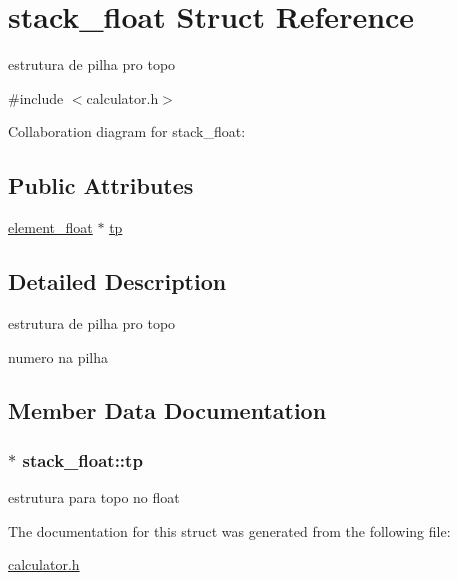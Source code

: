 \hypertarget{structstack__float}{}\section{stack\+\_\+float Struct Reference}
\label{structstack__float}


estrutura de pilha pro topo  




{\ttfamily \#include $<$calculator.\+h$>$}



Collaboration diagram for stack\+\_\+float\+:
\subsection*{Public Attributes}
\begin{DoxyCompactItemize}
\item 
\hyperlink{calculator_8h_a6c1a29e047a73874b8e99fcb568d674f}{element\+\_\+float} $\ast$ \hyperlink{structstack__float_a8e0908e05e8adc99988cad2e12c525ac}{tp}
\end{DoxyCompactItemize}


\subsection{Detailed Description}
estrutura de pilha pro topo 

numero na pilha 

\subsection{Member Data Documentation}
\subsubsection[{\texorpdfstring{tp}{tp}}]{$\ast$ stack\+\_\+float\+::tp}\hypertarget{structstack__float_a8e0908e05e8adc99988cad2e12c525ac}{}\label{structstack__float_a8e0908e05e8adc99988cad2e12c525ac}
estrutura para topo no float 

The documentation for this struct was generated from the following file\+:\begin{DoxyCompactItemize}
\item 
\hyperlink{calculator_8h}{calculator.\+h}\end{DoxyCompactItemize}
